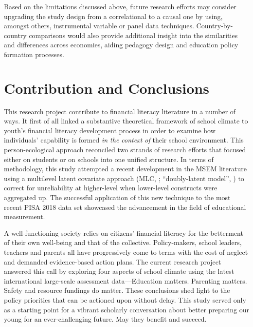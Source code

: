 Based on the limitations discussed above, future research efforts may consider upgrading the study design from a correlational to a causal one by using, amongst others, instrumental variable \parencite{pokropek:2016} or panel data \parencite{salasvelasco:2019} techniques. Country-by-country comparisons would also provide additional insight into the similarities and differences across economies, aiding pedagogy design and education policy formation processes.

\section{Contribution and Conclusions}

This research project contribute to financial literacy literature in a number of ways. It first of all linked a substantive theoretical framework of school climate to youth's financial literacy development process in order to examine how individuals' capability is formed \emph{in the context of} their school environment. This person-ecological approach reconciled two strands of research efforts that focused either on students or on schools into one unified structure. In terms of methodology, this study attempted a recent development in the MSEM literature using a multilevel latent covariate approach (MLC, \textcite{ludtke:2008}; ``doubly-latent model'', \textcite{marsh:2009}) to correct for unreliability at higher-level when lower-level constructs were aggregated up. The successful application of this new technique to the most recent PISA 2018 data set showcased the advancement in the field of educational measurement.


A well-functioning society relies on citizens' financial literacy for the betterment of their own well-being and that of the collective. Policy-makers, school leaders, teachers and parents all have progressively come to terms with the cost of neglect and demanded evidence-based action plans. The current research project answered this call by exploring four aspects of school climate using the latest international large-scale assessment data---Education matters. Parenting matters. Safety and resource fundings do matter. These conclusions shed light to the policy priorities that can be actioned upon without delay. This study served only as a starting point for a vibrant scholarly conversation about better preparing our young for an ever-challenging future. May they benefit and succeed.
